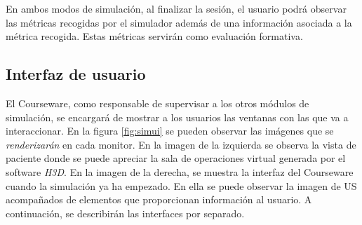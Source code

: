 En ambos modos de simulación, al finalizar la sesión, el usuario podrá observar las métricas recogidas por el simulador además de una información asociada a la métrica recogida. Estas métricas servirán como evaluación formativa.






\subsection{Interfaz de usuario}
\label{course:ui}
El \ac{Courseware}, como responsable de supervisar a los otros módulos de simulación, se encargará de mostrar a los usuarios las ventanas con las que va a interaccionar. En la figura \ref{fig:simui} se pueden observar las imágenes que se \emph{renderizarán} en cada monitor. En la imagen de la izquierda se observa la vista de paciente donde se puede apreciar la sala de operaciones virtual generada por el software \emph{H3D}. En la imagen de la derecha, se muestra la interfaz del \ac{Courseware} cuando la simulación ya ha empezado. En ella se puede observar la imagen de \ac{US} acompañados de elementos que proporcionan información al usuario. A continuación, se describirán las interfaces por separado.


